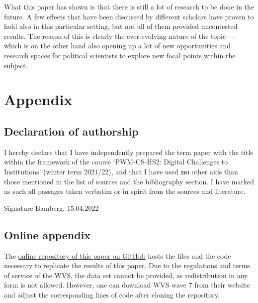 \documentclass[
  12pt,
  english,
]{article}
\begin{document}
What this paper has shown is that there is still a lot of research to be
done in the future. A few effects that have been discussed by different
scholars have proven to hold also in this particular setting, but not
all of them provided uncontested results. The reason of this is clearly
the ever-evolving nature of the topic --- which is on the other hand
also opening up a lot of new opportunities and research spaces for
political scientists to explore new focal points within the subject.

\newpage{}

\hypertarget{appendix}{%
\section{Appendix}\label{appendix}}

\hypertarget{declaration-of-authorship}{%
\subsection{Declaration of authorship}\label{declaration-of-authorship}}

I hereby declare that I have independently prepared the term paper with
the title within the framework of the course `PWM-CS-HS2: Digital
Challenges to Institutions' (winter term 2021/22), and that I have used
\textbf{no} other aids than those mentioned in the list of sources and
the bibliography section. I have marked as such all passages taken
verbatim or in spirit from the sources and literature.

\vfill

Signature \hfill Bamberg, 15.04.2022

\newpage{}

\hypertarget{online-appendix}{%
\subsection{Online appendix}\label{online-appendix}}

The \href{https://github.com/FWisniewski44/digital-challenges}{online
repository of this paper on GitHub} hosts the files and the code
necessary to replicate the results of this paper. Due to the regulations
and terms of service of the WVS, the data set cannot be provided, as
redistribution in any form is not allowed. However, one can download WVS
wave 7 from their website and adjust the corresponding lines of code
after cloning the repository.

\clearpage
\end{document}

